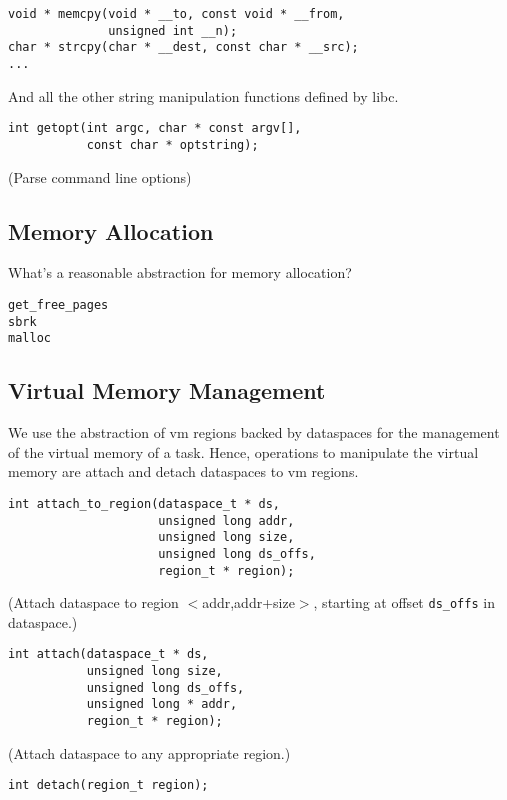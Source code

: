 \documentclass[twocolumn,10pt]{article}
\begin{document}
\begin{Verbatim}[fontsize=\small]
void * memcpy(void * __to, const void * __from, 
              unsigned int __n);
char * strcpy(char * __dest, const char * __src);
...
\end{Verbatim}
And all the other string manipulation functions defined by libc.

\begin{Verbatim}[fontsize=\small]
int getopt(int argc, char * const argv[], 
           const char * optstring);
\end{Verbatim}
(Parse command line options)

\subsection{Memory Allocation}

What's a reasonable abstraction for memory allocation?
\begin{Verbatim}[fontsize=\small]
get_free_pages
sbrk
malloc
\end{Verbatim}

\subsection{Virtual Memory Management}

We use the abstraction of vm regions backed by dataspaces for the
management of the virtual memory of a task. Hence, operations to
manipulate the virtual memory are attach and detach dataspaces to vm
regions.

\begin{Verbatim}[fontsize=\small]
int attach_to_region(dataspace_t * ds, 
                     unsigned long addr,
                     unsigned long size, 
                     unsigned long ds_offs,
                     region_t * region); 
\end{Verbatim}
(Attach dataspace to region $<$addr,addr+size$>$, starting at offset
{\tt ds\_offs} in dataspace.)

\begin{Verbatim}[fontsize=\small]
int attach(dataspace_t * ds,
           unsigned long size,
           unsigned long ds_offs,
           unsigned long * addr,
           region_t * region);
\end{Verbatim}
(Attach dataspace to any appropriate region.)

\begin{Verbatim}[fontsize=\small]
int detach(region_t region);
\end{Verbatim}
\end{document}
